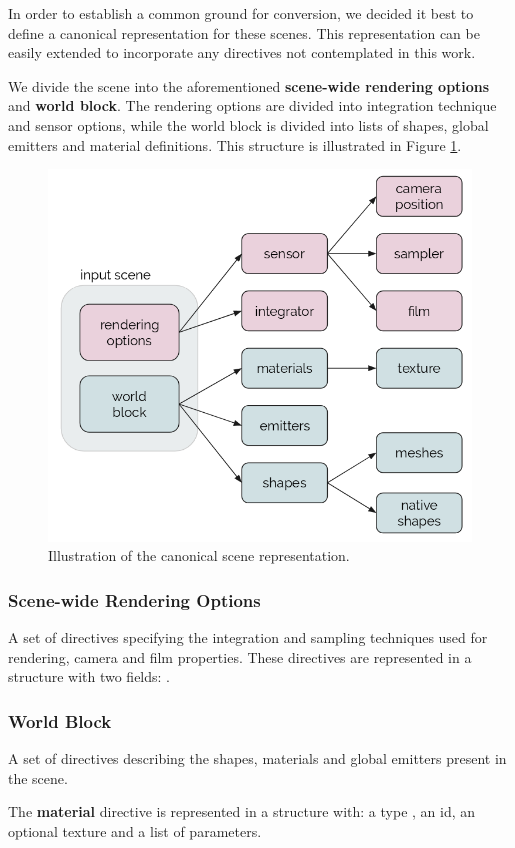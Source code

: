 In order to establish a common ground for conversion, we decided it best to
define a canonical representation for these scenes. This representation can be
easily extended to incorporate any directives not contemplated in this work.

We divide the scene into the aforementioned \textbf{scene-wide rendering options} and \textbf{world
block}. The rendering options are divided into integration technique and sensor
options, while the world block is divided into lists of shapes, global emitters
and material definitions. This structure is illustrated in Figure
\ref{fig:canonicalrep}.

\begin{figure}[h]
\centering
\includegraphics[width=0.6\linewidth]{figs/3_system_architecture/canonicalrep.png}
\caption{Illustration of the canonical scene representation.}
\label{fig:canonicalrep}
\end{figure}

\subsubsection{Scene-wide Rendering Options}
A set of directives specifying the integration and sampling techniques used for
rendering, camera and film properties. These directives are represented in a
structure with two fields: .

\subsubsection{World Block}
A set of directives describing the shapes, materials and global emitters present
in the scene.

The \textbf{material} directive is represented in a structure with: a type , an
id, an optional texture and a list of parameters.

